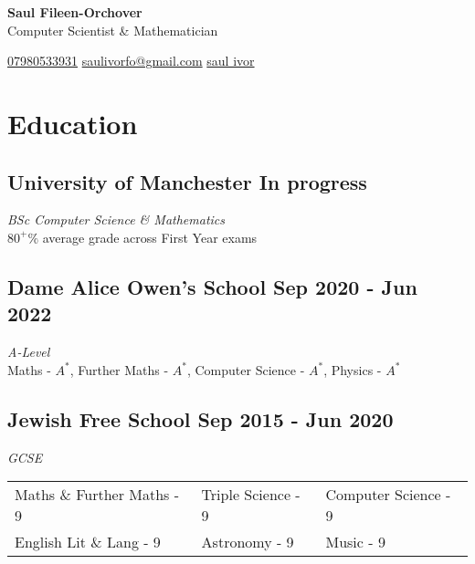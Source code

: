\documentclass[a4paper,10pt]{article}
\begin{document}
\pagestyle{empty}


\begin{center}
    \textbf{\Huge Saul Fileen-Orchover} \\
    \vspace{1mm}
     Computer Scientist \& Mathematician
\end{center}

\begin{center}
     \href{https://wa.me/1234567890}{07980533931} \hspace{2cm}
     \href{mailto:saulivorfo@gmail.com}{saulivorfo@gmail.com} \hspace{2cm}
     \href{https://www.linkedin.com/in/saul-ivor-4305872a0/}{saul ivor}
\end{center}

\vspace{-3mm}

\section*{ Education}

\subsection*{University of Manchester \hfill In progress}
\textit{BSc Computer Science \& Mathematics}\\
$80^+\%$ average grade across First Year exams

\subsection*{Dame Alice Owen's School \hfill Sep 2020 - Jun 2022}
\textit{A-Level}\\
Maths - $A^*$, 
Further Maths - $A^*$, 
Computer Science - $A^*$, 
Physics - $A^*$

\subsection*{Jewish Free School \hfill Sep 2015 - Jun 2020}
\textit{GCSE}\\
\begin{tabular}{@{} l l l}
    Maths \& Further Maths - 9 & Triple Science - 9 & Computer Science - 9\\
    English Lit \& Lang - 9 & Astronomy - 9 & Music - 9
\end{tabular}
\end{document}
